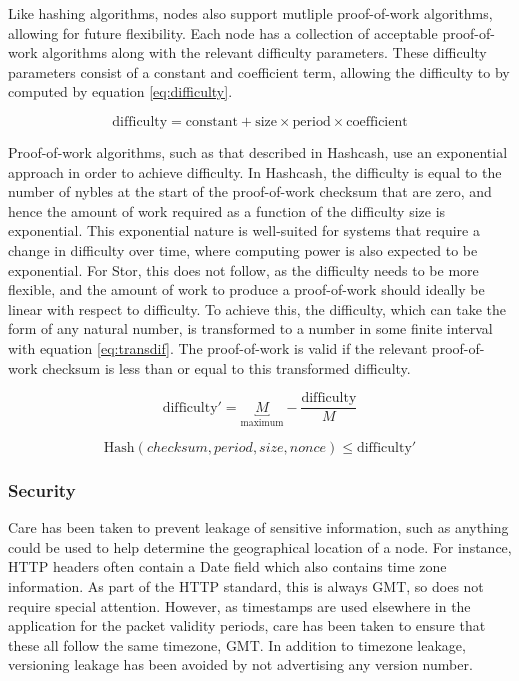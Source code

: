			Like hashing algorithms, nodes also support mutliple proof-of-work algorithms, allowing for future flexibility. Each node has a collection of acceptable proof-of-work algorithms along with the relevant difficulty parameters. These difficulty parameters consist of a constant and coefficient term, allowing the difficulty to by computed by equation \ref{eq:difficulty}. 
		
			\begin{equation} \label{eq:difficulty}
			\text{difficulty} = \text{constant} + \text{size} \times \text{period} \times \text{coefficient}
			\end{equation}
			
			Proof-of-work algorithms, such as that described in Hashcash, use an exponential approach in order to achieve difficulty. In Hashcash, the difficulty is equal to the number of nybles at the start of the proof-of-work checksum that are zero, and hence the amount of work required as a function of the difficulty size is exponential. This exponential nature is well-suited for systems that require a change in difficulty over time, where computing power is also expected to be exponential. For Stor, this does not follow, as the difficulty needs to be more flexible, and the amount of work to produce a proof-of-work should ideally be linear with respect to difficulty. To achieve this, the difficulty, which can take the form of any natural number, is transformed to a number in some finite interval with equation \ref{eq:transdif}. The proof-of-work is valid if the relevant proof-of-work checksum is less than or equal to this transformed difficulty.
		
			\begin{equation} \label{eq:transdif}
			\text{difficulty}' = \underbracket{M}_\text{maximum} - \frac{\text{difficulty}}{M}
			\end{equation}
			
			\begin{equation}
			\text{Hash}(checksum, period, size, nonce) \le \text{difficulty}'
			\end{equation}

				
		
		
		\subsubsection*{Security}
			Care has been taken to prevent leakage of sensitive information, such as anything could be used to help determine the geographical location of a node. For instance, HTTP headers often contain a Date field which also contains time zone information. As part of the HTTP standard, this is always GMT, so does not require special attention. However, as timestamps are used elsewhere in the application for the packet validity periods, care has been taken to ensure that these all follow the same timezone, GMT. In addition to timezone leakage, versioning leakage has been avoided by not advertising any version number.
			

